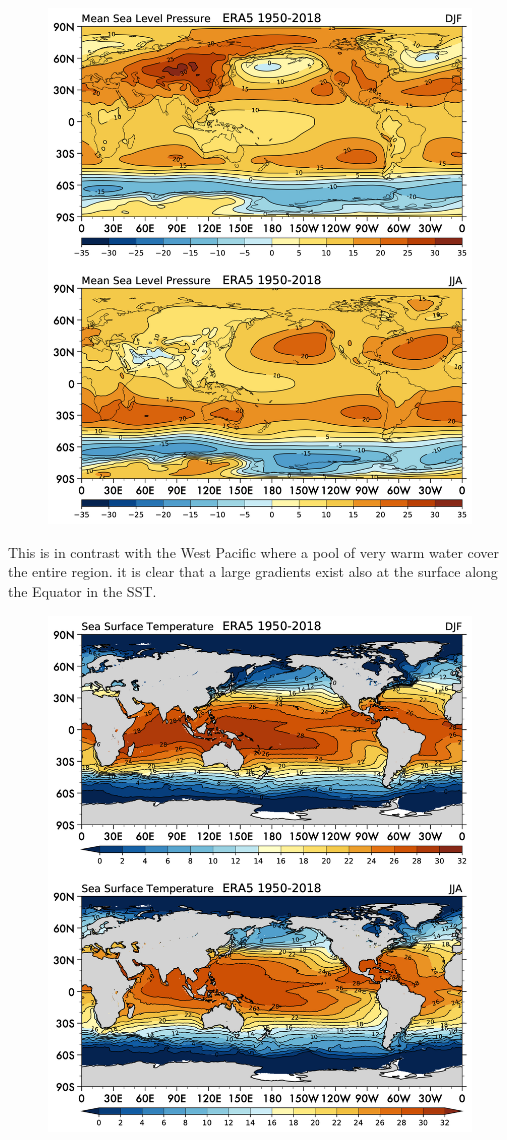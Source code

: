 \begin{figure}
\centering
\includegraphics[width = .7 \textwidth]{figs/GD/MSL.png}
\caption{}\label{}
\end{figure}

This is in contrast with the West Pacific where a pool of very warm
water cover the entire region. it is clear that a large gradients exist
also at the surface along the Equator in the SST.

\begin{figure}
\centering
\includegraphics[width = .7 \textwidth]{figs/GD/SST.png}
\caption{}\label{}
\end{figure}

